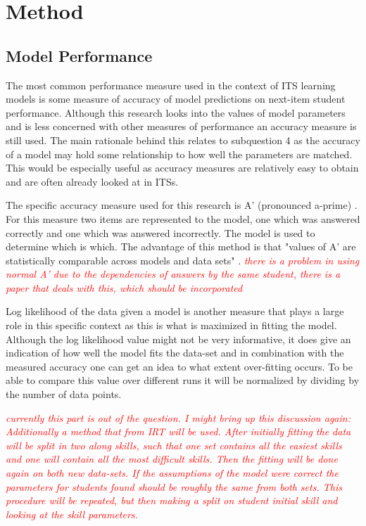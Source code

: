\documentclass{scrartcl}
\newcommand\todo[1]{\textit{\textcolor{red}{#1}}}
\begin{document}
\section{Method}


\subsection{Model Performance}

\label{sec:perf}
The most common performance measure used in the context of ITS learning models is some measure of accuracy of model predictions on next-item student performance. Although this research looks into the values of model parameters and is less concerned with other measures of performance an accuracy measure is still used. The main rationale behind this relates to subquestion 4 as the accuracy of a model may hold some relationship to how well the parameters are matched. This would be especially useful as accuracy measures are relatively easy to obtain and are often already looked at in ITSs. 

The specific accuracy measure used for this research is A' (pronounced a-prime) \cite{modelreview}. For this measure two items are represented to the model, one which was answered correctly and one which was answered incorrectly. The model is used to determine which is which. The advantage of this method is that "values of A' are statistically comparable across models and data sets" \cite{modelreview}. \todo{there is a problem in using normal A' due to the dependencies of answers by the same student, there is a paper that deals with this, which should be incorporated}

Log likelihood of the data given a model is another measure that plays a large role in this specific context as this is what is maximized in fitting the model. Although the log likelihood value might not be very informative, it does give an indication of how well the model fits the data-set and in combination with the measured accuracy one can get an idea to what extent over-fitting occurs. To be able to compare this value over different runs it will be normalized by dividing by the number of data points.


\todo{currently this part is out of the question. I might bring up this discussion again:
Additionally a method that from IRT \cite{hambleton} will be used. After initially fitting the data will be split in two along skills, such that one set contains all the easiest skills and one will contain all the most difficult skills. Then the fitting will be done again on both new data-sets. If the assumptions of the model were correct the parameters for students found should be roughly the same from both sets. This procedure will be repeated, but then making a split on student initial skill and looking at the skill parameters.}
\end{document}
